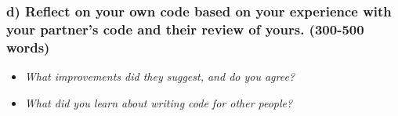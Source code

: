 \documentclass[
]{article}
\begin{document}
\subsubsection{d) Reflect on your own code based on your experience with
your partner's code and their review of yours. (300-500
words)}\label{d-reflect-on-your-own-code-based-on-your-experience-with-your-partners-code-and-their-review-of-yours.-300-500-words}

\begin{itemize}
\item
  \emph{What improvements did they suggest, and do you agree?}
\item
  \emph{What did you learn about writing code for other people?}
\end{itemize}
\end{document}
